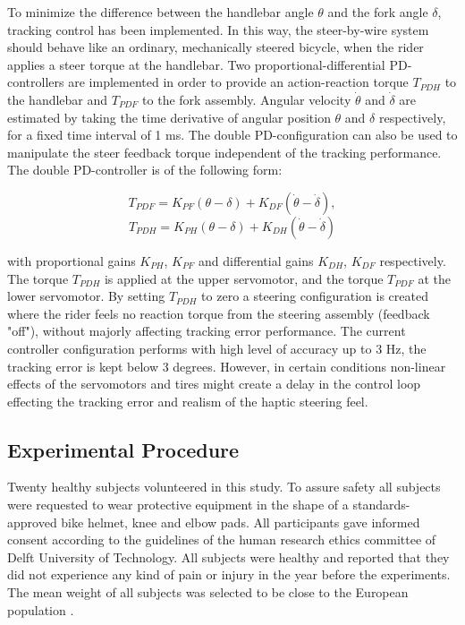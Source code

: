 To minimize the difference between the handlebar angle $\theta$ and the fork angle $\delta$, tracking control has been implemented. In this way, the steer-by-wire system should behave like an ordinary, mechanically steered bicycle, when the rider applies a steer torque at the handlebar. Two proportional-differential PD-controllers are implemented in order to provide an action-reaction torque $T_{PDH}$ to the handlebar and $T_{PDF}$ to the fork assembly. Angular velocity $\dot{\theta}$ and  $\dot{\delta}$ are estimated by taking the time derivative of angular position $\theta$ and $\delta$ respectively, for a fixed time interval of 1 ms. The double PD-configuration can also be used to manipulate the steer feedback torque independent of the tracking performance. The double PD-controller is of the following form:


\begin{equation}
T_{PDF}=K_{PF}(\theta-\delta)+K_{DF}(\dot{\theta}-\dot{\delta}),
\label{handlebar-controller}
\end{equation}
\begin{equation}
T_{PDH}=K_{PH}(\theta-\delta)+K_{DH}(\dot{\theta}-\dot{\delta})
\label{fork-controller}
\end{equation}

with proportional gains $K_{PH}$, $K_{PF}$ and differential gains $K_{DH}$, $K_{DF}$ respectively. The torque $T_{PDH}$ is applied at the upper servomotor, and the torque $T_{PDF}$ at the lower servomotor. By setting $T_{PDH}$ to zero a steering configuration is created where the rider feels no reaction torque from the steering assembly (feedback "off"), without majorly affecting tracking error performance. The current controller configuration performs with high level of accuracy up to 3 Hz, the tracking error is kept below 3 degrees. However, in certain conditions non-linear effects of the servomotors and tires might create a delay in the control loop effecting the tracking error and realism of the haptic steering feel.


\subsection{Experimental Procedure}

Twenty healthy subjects volunteered in this study. To assure safety all subjects were requested to wear protective equipment in the shape of a standards-approved bike helmet, knee and elbow pads. All participants gave informed consent according to the guidelines of the human research ethics committee of Delft University of Technology. All subjects were healthy and reported that they did not experience any kind of pain or injury in the year before the experiments. The mean weight of all subjects was selected to be close to the European population \cite{walpole2012weight}.

